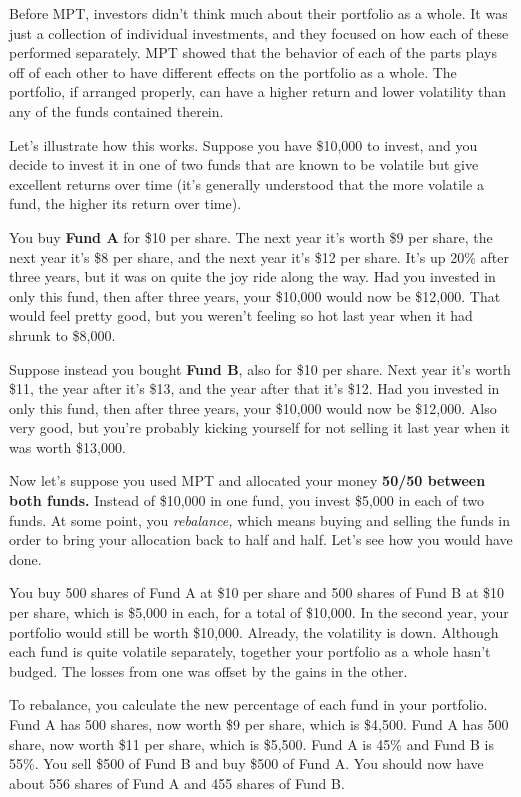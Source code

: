 Before MPT, investors didn't think much about their portfolio as a whole. It was just a collection of individual investments, and they focused on how each of these performed separately. MPT showed that the behavior of each of the parts plays off of each other to have different effects on the portfolio as a whole. The portfolio, if arranged properly, can have a higher return and lower volatility than any of the funds contained therein.

Let's illustrate how this works. Suppose you have \$10,000 to invest, and you decide to invest it in one of two funds that are known to be volatile but give excellent returns over time (it's generally understood that the more volatile a fund, the higher its return over time).

You buy \textbf{Fund A} for \$10 per share. The next year it's worth \$9 per share, the next year it's \$8 per share, and the next year it's \$12 per share. It's up 20\% after three years, but it was on quite the joy ride along the way. Had you invested in only this fund, then after three years, your \$10,000 would now be \$12,000. That would feel pretty good, but you weren't feeling so hot last year when it had shrunk to \$8,000.

Suppose instead you bought \textbf{Fund B}, also for \$10 per share. Next year it's worth \$11, the year after it's \$13, and the year after that it's \$12. Had you invested in only this fund, then after three years, your \$10,000 would now be \$12,000. Also very good, but you're probably kicking yourself for not selling it last year when it was worth \$13,000.

Now let's suppose you used MPT and allocated your money \textbf{50/50 between both funds.} Instead of \$10,000 in one fund, you invest \$5,000 in each of two funds. At some point, you \emph{rebalance,} which means buying and selling the funds in order to bring your allocation back to half and half. Let's see how you would have done.

You buy 500 shares of Fund A at \$10 per share and 500 shares of Fund B at \$10 per share, which is \$5,000 in each, for a total of \$10,000. In the second year, your portfolio would still be worth \$10,000. Already, the volatility is down. Although each fund is quite volatile separately, together your portfolio as a whole hasn't budged. The losses from one was offset by the gains in the other.

To rebalance, you calculate the new percentage of each fund in your portfolio. Fund A has 500 shares, now worth \$9 per share, which is \$4,500. Fund A has 500 share, now worth \$11 per share, which is \$5,500. Fund A is 45\% and Fund B is 55\%. You sell \$500 of Fund B and buy \$500 of Fund A. You should now have about 556 shares of Fund A and 455 shares of Fund B.

